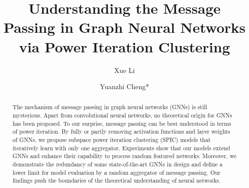 \documentclass[preprint,11pt]{elsarticle}
\begin{document}
\begin{frontmatter}



\title{Understanding the Message Passing in Graph Neural Networks via Power Iteration Clustering}


\author[label1]{Xue Li}

\author[label1]{Yuanzhi Cheng*}

\address[label1]{ School of Computer Science and Technology\\
  Harbin Institute of Technology\\
  Harbin, Heilongjiang, China 150001 \\}
  


\begin{abstract}
The mechanism of message passing in graph neural networks (GNNs) is still mysterious. Apart from convolutional neural networks, no theoretical origin for GNNs has been proposed. To our surprise, message passing can be best understood in terms of power iteration. By fully or partly removing activation functions and layer weights of GNNs, we propose subspace power iteration clustering (SPIC) models that iteratively learn with only one aggregator. Experiments show that our models extend GNNs and enhance their capability to process random featured networks. Moreover, we demonstrate the redundancy of some state-of-the-art GNNs in design and define a lower limit for model evaluation by a random aggregator of message passing. Our findings push the boundaries of  the theoretical understanding of neural networks.


\end{abstract}
\end{frontmatter}
\end{document}
